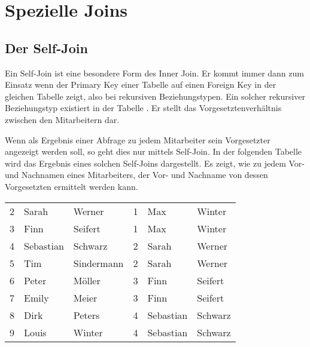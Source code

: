 \section{Spezielle Joins}
\subsection{Der Self-Join}
Ein Self-Join ist eine besondere Form des Inner Join. Er kommt immer dann zum Einsatz wenn der Primary Key einer Tabelle auf einen Foreign Key in der gleichen Tabelle zeigt, also bei rekursiven Beziehungstypen. Ein solcher rekursiver Beziehungstyp existiert in der Tabelle . Er stellt das Vorgesetztenverhältnis zwischen den Mitarbeitern dar.

Wenn als Ergebnis einer Abfrage zu jedem Mitarbeiter sein Vorgesetzter angezeigt werden soll, so geht dies nur mittels Self-Join. In der folgenden Tabelle wird  das Ergebnis eines solchen Self-Joins dargestellt. Es zeigt, wie zu jedem Vor- und Nachnamen eines Mitarbeiters, der Vor- und Nachname von dessen Vorgesetzten ermittelt werden kann.
\clearpage
\begin{center}
    \begin{small}
        \tablehead{}
        \tablelasttail {}
        \begin{msoraclesql}
            \begin{supertabular}{rllrll}
                2 & Sarah & Werner & 1 & Max & Winter \\
                3 & Finn & Seifert & 1 & Max & Winter \\
                4 & Sebastian & Schwarz & 2 & Sarah & Werner \\
                5 & Tim & Sindermann & 2 & Sarah & Werner \\
                6 & Peter & Möller & 3 & Finn & Seifert \\
                7 & Emily & Meier & 3 & Finn & Seifert \\
                8 & Dirk & Peters & 4 & Sebastian & Schwarz \\
                9 & Louis & Winter & 4 & Sebastian & Schwarz \\
            \end{supertabular}
        \end{msoraclesql}
    \end{small}
\end{center}

